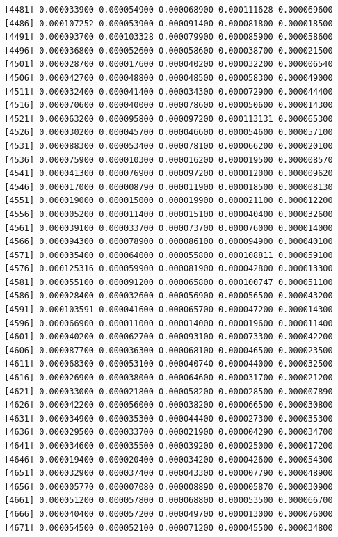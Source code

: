 \documentclass[]{article}
\begin{document}
\begin{verbatim}
 [4481] 0.000033900 0.000054900 0.000068900 0.000111628 0.000069600
 [4486] 0.000107252 0.000053900 0.000091400 0.000081800 0.000018500
 [4491] 0.000093700 0.000103328 0.000079900 0.000085900 0.000058600
 [4496] 0.000036800 0.000052600 0.000058600 0.000038700 0.000021500
 [4501] 0.000028700 0.000017600 0.000040200 0.000032200 0.000006540
 [4506] 0.000042700 0.000048800 0.000048500 0.000058300 0.000049000
 [4511] 0.000032400 0.000041400 0.000034300 0.000072900 0.000044400
 [4516] 0.000070600 0.000040000 0.000078600 0.000050600 0.000014300
 [4521] 0.000063200 0.000095800 0.000097200 0.000113131 0.000065300
 [4526] 0.000030200 0.000045700 0.000046600 0.000054600 0.000057100
 [4531] 0.000088300 0.000053400 0.000078100 0.000066200 0.000020100
 [4536] 0.000075900 0.000010300 0.000016200 0.000019500 0.000008570
 [4541] 0.000041300 0.000076900 0.000097200 0.000012000 0.000009620
 [4546] 0.000017000 0.000008790 0.000011900 0.000018500 0.000008130
 [4551] 0.000019000 0.000015000 0.000019900 0.000021100 0.000012200
 [4556] 0.000005200 0.000011400 0.000015100 0.000040400 0.000032600
 [4561] 0.000039100 0.000033700 0.000073700 0.000076000 0.000014000
 [4566] 0.000094300 0.000078900 0.000086100 0.000094900 0.000040100
 [4571] 0.000035400 0.000064000 0.000055800 0.000108811 0.000059100
 [4576] 0.000125316 0.000059900 0.000081900 0.000042800 0.000013300
 [4581] 0.000055100 0.000091200 0.000065800 0.000100747 0.000051100
 [4586] 0.000028400 0.000032600 0.000056900 0.000056500 0.000043200
 [4591] 0.000103591 0.000041600 0.000065700 0.000047200 0.000014300
 [4596] 0.000066900 0.000011000 0.000014000 0.000019600 0.000011400
 [4601] 0.000040200 0.000062700 0.000093100 0.000073300 0.000042200
 [4606] 0.000087700 0.000036300 0.000068100 0.000046500 0.000023500
 [4611] 0.000068300 0.000053100 0.000040740 0.000044000 0.000032500
 [4616] 0.000026900 0.000038000 0.000064600 0.000031700 0.000021200
 [4621] 0.000033000 0.000021800 0.000058200 0.000028500 0.000007890
 [4626] 0.000042200 0.000056000 0.000038200 0.000066500 0.000030800
 [4631] 0.000034900 0.000035300 0.000044400 0.000027300 0.000035300
 [4636] 0.000029500 0.000033700 0.000021900 0.000004290 0.000034700
 [4641] 0.000034600 0.000035500 0.000039200 0.000025000 0.000017200
 [4646] 0.000019400 0.000020400 0.000034200 0.000042600 0.000054300
 [4651] 0.000032900 0.000037400 0.000043300 0.000007790 0.000048900
 [4656] 0.000005770 0.000007080 0.000008890 0.000005870 0.000030900
 [4661] 0.000051200 0.000057800 0.000068800 0.000053500 0.000066700
 [4666] 0.000040400 0.000057200 0.000049700 0.000013000 0.000076000
 [4671] 0.000054500 0.000052100 0.000071200 0.000045500 0.000034800

\end{verbatim}
\end{document}
